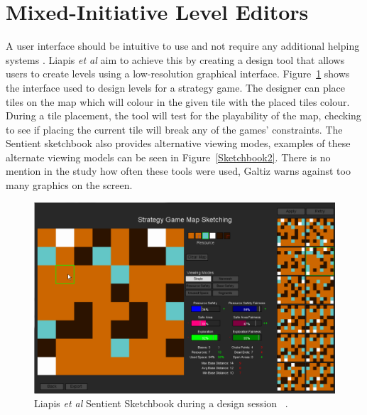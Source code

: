 \documentclass[journal]{IEEEtran}
\begin{document}
\section{Mixed-Initiative Level Editors } \label{UI}
A user interface should be intuitive to use and not require any additional helping systems \cite{oppermann2002user}. Liapis \textit{et al} \cite{liapis2013sentient} aim to achieve this by creating a design tool that allows users to create levels using a low-resolution graphical interface. Figure~\ref{Sketchbook} shows the interface used to design levels for a strategy game. The designer can place tiles on the map which will colour in the given tile with the placed tiles colour. During a tile placement, the tool will test for the playability of the map, checking to see if placing the current tile will break any of the games' constraints.  The Sentient sketchbook also provides alternative viewing modes, examples of these alternate viewing models can be seen in Figure~\ref{Sketchbook2}.  There is no mention in the study how often these tools were used, Galtiz \cite[p.~752]{galitz2007essential} warns against too many graphics on the screen.

\begin{figure}[h]
	\includegraphics[width=1.0\linewidth]{SentientSketchbook.PNG}
	\caption{Liapis \textit{et al} Sentient Sketchbook during a design session ~\cite{liapis2013sentient}.}
	\label{Sketchbook}
\end{figure} 
\end{document}
